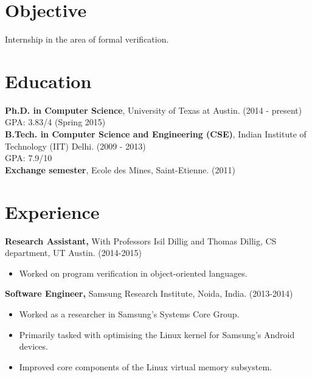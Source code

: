 \documentclass[margin]{res}
\begin{document}
 
 
 
\address{Department of Computer Science \\University of Texas at Austin \\ Austin, TX 78712  \\
        +1 512-952-0104 \\ mihir@cs.utexas.edu }

 
\begin{resume} 
 
\section{Objective} 
Internship in the area of formal verification.

\section{Education} 
{\bf Ph.D. in Computer Science}, University of Texas at Austin. \hfill (2014 - present)\\
GPA: 3.83/4 \hfill (Spring 2015)\\
{\bf B.Tech. in Computer Science and Engineering (CSE)}, Indian Institute of
Technology (IIT) Delhi. \hfill (2009 - 2013)\\
GPA: 7.9/10\\
{\bf Exchange semester}, Ecole des Mines, Saint-Etienne. \hfill (2011)

\section{Experience}

 {\bf Research Assistant,} With Professors Isil Dillig and Thomas
 Dillig, CS department, UT Austin. \hfill (2014-2015)
 \begin{itemize} \itemsep -2pt  %
 \item Worked on program verification in object-oriented languages.
 \end{itemize}
 
 {\bf Software Engineer,} Samsung Research Institute, Noida, India. \hfill (2013-2014)
 \begin{itemize} \itemsep -2pt  %
 \item Worked as a researcher in Samsung's Systems Core Group.
 \item Primarily tasked with optimising the Linux kernel for Samsung's
   Android devices.
 \item Improved core components of the Linux virtual memory subsystem.
 \end{itemize}


\end{resume}
\end{document}
